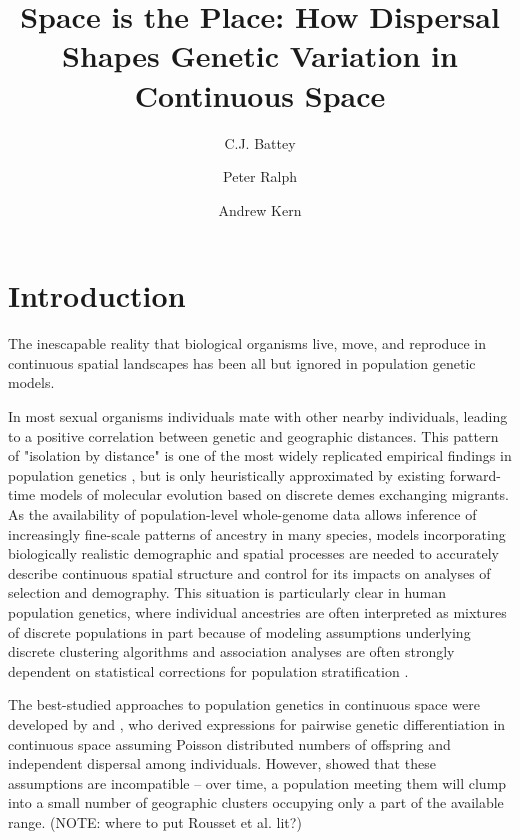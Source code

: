 \documentclass[9pt,twocolumn,twoside]{gsajnl}
\title{Space is the Place: How Dispersal Shapes Genetic Variation in Continuous Space}
\author[$\ast$,1]{C.J. Battey}
\author[$\dagger$,1]{Peter Ralph}
\author[$\ddagger$,2]{Andrew Kern}
\affil[$\ast$]{University of Oregon Dept. Biology, Institute for Ecology Evolution}
\begin{document}
\maketitle
\thispagestyle{firststyle}
\marginmark
\firstpagefootnote


\vspace{-35pt}%

\section{Introduction}
The inescapable reality that biological organisms live, move, and reproduce in continuous spatial landscapes has been all but ignored in population genetic models. 

In most sexual organisms individuals mate with other nearby individuals, leading to a positive correlation between genetic and geographic distances. This pattern of "isolation by distance" \citep{Wright1943} is one of the most widely replicated empirical findings in population genetics \citep{Chen2017,Jay2012,Sharbel2000}, but is only heuristically approximated by existing forward-time models of molecular evolution based on discrete demes exchanging migrants. As the availability of population-level whole-genome data allows inference of increasingly fine-scale patterns of ancestry in many species, models incorporating biologically realistic demographic and spatial processes are needed to accurately describe continuous spatial structure and control for its impacts on analyses of selection and demography. This situation is particularly clear in human population genetics, where individual ancestries are often interpreted as mixtures of discrete populations in part because of modeling assumptions underlying discrete clustering algorithms and association analyses are often strongly dependent on statistical corrections for population stratification \citep{Berg2018}.  

The best-studied approaches to population genetics in continuous space were developed by \citep{Wright1943} and \citep{Malecot1948}, who derived expressions for pairwise genetic differentiation in continuous space assuming Poisson distributed numbers of offspring and independent dispersal among individuals. However, \citep{Felsenstein1975} showed that these assumptions are incompatible -- over time, a population meeting them will clump into a small number of geographic clusters occupying only a part of the available range. (NOTE: where to put Rousset et al. lit?)
\end{document}
